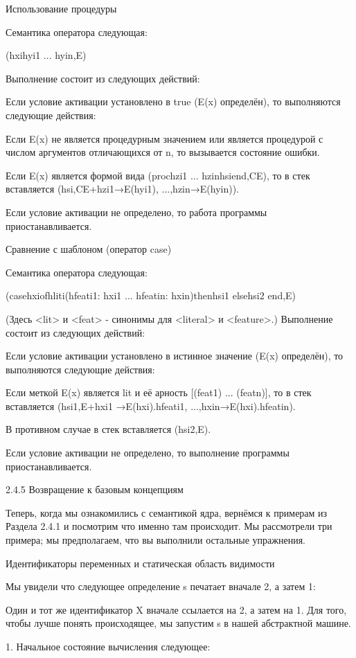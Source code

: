 Использование процедуры

Семантика оператора следующая:

({hxihyi1 ... hyin},E)

Выполнение состоит из следующих действий:

Если условие активации установлено в true (E(x) определён), то выполняются следующие действия:

Если E(x) не является процедурным значением или является процедурой с числом аргументов отличающихся от n, то вызывается состояние ошибки.

Если E(x) является формой вида (proc{hzi1 ... hzin}hsiend,CE), то в стек вставляется (hsi,CE+{hzi1→E(hyi1), ...,hzin→E(hyin)}).

Если условие активации не определено, то работа программы приостанавливается.

Сравнение с шаблоном (оператор case)

Семантика оператора следующая:

(casehxiofhliti(hfeati1: hxi1 ... hfeatin: hxin)thenhsi1 elsehsi2 end,E)

(Здесь <lit> и <feat> - синонимы для <literal> и <feature>.) Выполнение состоит из следующих действий:

Если условие активации установлено в истинное значение (E(x) определён), то выполняются следующие действия:

Если меткой E(x) является lit и её арность [(feat1) ... (featn)], то в стек вставляется (hsi1,E+{hxi1 →E(hxi).hfeati1, ...,hxin→E(hxi).hfeatin}).

В противном случае в стек вставляется (hsi2,E).

Если условие активации не определено, то выполнение программы приостанавливается.

2.4.5 Возвращение к базовым концепциям

Теперь, когда мы ознакомились с семантикой ядра, вернёмся к примерам из Раздела 2.4.1 и посмотрим что именно там происходит. Мы рассмотрели три примера; мы предполагаем, что вы выполнили остальные упражнения.

Идентификаторы переменных и статическая область видимости

Мы увидели что следующее определение s печатает вначале 2, а затем 1:

Один и тот же идентификатор X вначале ссылается на 2, а затем на 1. Для того, чтобы лучше понять происходящее, мы запустим s в нашей абстрактной машине.

1. Начальное состояние вычисления следующее:

